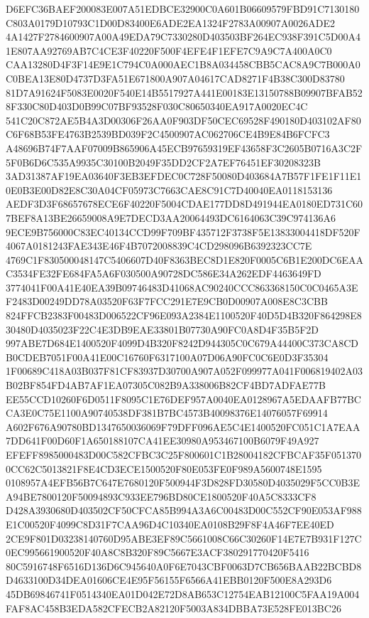 \documentclass[UTF8,fontset=fandol,zihao=-4,a4paper]{ctexart}
\begin{document}
{{D6EFC36BAEF200083E007A51EDBCE32900C0A601B06609579FBD91C7130180C803A0179D10793C1D00D83400E6ADE2EA1324F2783A00907A0026ADE2
4A1427F2784600907A00A49EDA79C7330280D403503BF264EC938F391C5D00A41E807AA92769AB7C4CE3F40220F500F4EFE4F1EFE7C9A9C7A400A0C0
CAA13280D4F3F14E9E1C794C0A000AEC1B8A034458CBB5CAC8A9C7B000A0C0BEA13E80D4737D3FA51E671800A907A04617CAD8271F4B38C300D83780
81D7A91624F5083E0020F540E14B5517927A441E00183E13150788B09907BFAB528F330C80D403D0B99C07BF93528F030C80650340EA917A0020EC4C
541C20C872AE5B4A3D00306F26AA0F903DF50CEC69528F490180D403102AF80C6F68B53FE4763B2539BD039F2C4500907AC062706CE4B9E84B6FCFC3
A48696B74F7AAF07009B865906A45ECB97659319EF43658F3C2605B0716A3C2F5F0B6D6C535A9935C30100B2049F35DD2CF2A7EF76451EF30208323B
3AD31387AF19EA03640F3EB3EFDEC0C728F50080D403684A7B57F1FE1F11E10E0B3E00D82E8C30A04CF05973C7663CAE8C91C7D40040EA0118153136
AEDF3D3F68657678ECE6F40220F5004CDAE177DD8D491944EA0180ED731C607BEF8A13BE26659008A9E7DECD3AA20064493DC6164063C39C974136A6
9ECE9B756000C83EC40134CCD99F709BF435712F3738F5E13833004418DF520F4067A0181243FAE343E46F4B7072008839C4CD298096B6392323CC7E
4769C1F830500048147C5406607D40F8363BEC8D1E820F0005C6B1E200DC6EAAC3534FE32FE684FA5A6F030500A90728DC586E34A262EDF4463649FD
3774041F00A41E40EA39B09746483D41068AC90240CCC863368150C0C0465A3EF2483D00249DD78A03520F63F7FCC291E7E9CB0D00907A008E8C3CBB
824FFCB2383F00483D006522CF96E093A2384E1100520F40D5D4B320F864298E830480D4035023F22C4E3DB9EAE33801B07730A90FC0A8D4F35B5F2D
997ABE7D684E1400520F4099D4B320F8242D944305C0C679A44400C373CA8CDB0CDEB7051F00A41E00C16760F6317100A07D06A90FC0C6E0D3F35304
1F00689C418A03B037F81CF83937D30700A907A052F099977A041F006819402A03B02BF854FD4AB7AF1EA07305C082B9A338006B82CF4BD7ADFAE77B
EE55CCD10260F6D0511F8095C1E76DEF957A0040EA0128967A5EDAAFB77BCCA3E0C75E1100A90740538DF381B7BC4573B40098376E14076057F69914
A602F676A90780BD1347650036069F79DFF096AE5C4E1400520FC051C1A7EAA7DD641F00D60F1A650188107CA41EE30980A953467100B6079F49A927
EFEFF8985000483D00C582CFBC3C25F800601C1B28004182CFBCAF35F0513700CC62C5013821F8E4CD3ECE1500520F80E053FE0F989A5600748E1595
0108957A4EFB56B7C647E7680120F500944F3D828FD30580D4035029F5CC0B3EA94BE7800120F50094893C933EE796BD80CE1800520F40A5C8333CF8
D428A3930680D403502CF50CFCA85B994A3A6C00483D00C552CF90E053AF988E1C00520F4099C8D31F7CAA96D4C10340EA0108B29F8F4A46F7EE40ED
2CE9F801D03238140760D95ABE3EF89C5661008C66C30260F14E7E7B931F127C0EC995661900520F40A8C8B320F89C5667E3ACF380291770420F5416
80C5916748F6516D136D6C945640A0F6E7043CBF0063D7CB656BAAB22BCBD8D4633100D34DEA01606CE4E95F56155F6566A41EBB0120F500E8A293D6
45DB69846741F0514340EA01D042E72D8AB653C12754EAB12100C5FAA19A004FAF8AC458B3EDA582CFECB2A82120F5003A834DBBA73E528FE013BC26
}}
\end{document}
